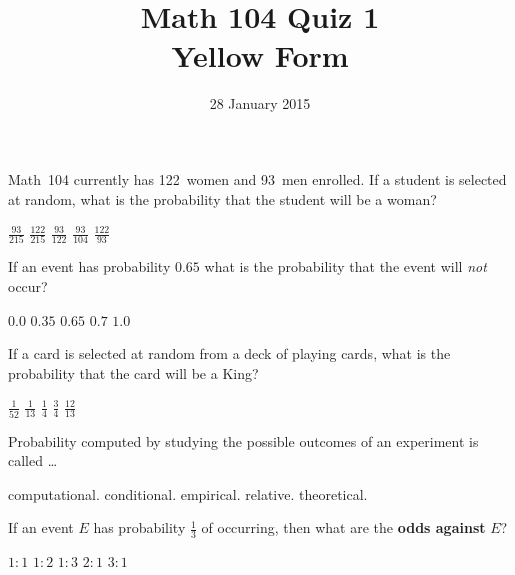\documentclass[answers,12pt]{exam}
\title{Math 104 Quiz 1\\Yellow Form}
\date{28 January 2015}
\begin{document}
\maketitle
\begin{center}
\end{center}

\begin{questions}
\question Math~104 currently has 122~women and 93~men enrolled.
If a student is selected at random, what is the probability
that the student will be a woman?\\
\begin{oneparchoices}
\choice $\frac{93}{215}$
\choice $\frac{122}{215}$
\choice $\frac{93}{122}$
\choice $\frac{93}{104}$
\choice $\frac{122}{93}$
\end{oneparchoices}

\question If an event has probability $0.65$
what is the probability that the event will {\em not} occur?\\
\begin{oneparchoices}
\choice $0.0$
\choice $0.35$
\choice $0.65$
\choice $0.7$
\choice $1.0$
\end{oneparchoices}

\question If a card is selected at random from a deck of
playing cards, what is the probability that
the card will be a King?\\
\begin{oneparchoices}
\choice $\frac{1}{52}$
\choice $\frac{1}{13}$
\choice $\frac{1}{4}$
\choice $\frac{3}{4}$
\choice $\frac{12}{13}$
\end{oneparchoices}

\question Probability computed by studying
the possible outcomes of an experiment is called \dots\\
\begin{oneparchoices}
\choice computational.
\choice conditional.
\choice empirical.
\choice relative.
\choice theoretical.
\end{oneparchoices}

\question If an event $E$ has probability $\frac{1}{3}$
of occurring, then what are the {\bf odds against} $E$?\\
\begin{oneparchoices}
\choice $1:1$
\choice $1:2$ %
\choice $1:3$ %
\correctchoice $2:1$
\choice $3:1$ %
\end{oneparchoices}


\end{questions}
\end{document}

